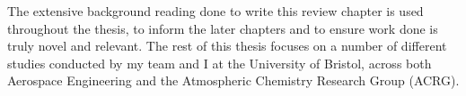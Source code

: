 The extensive background reading done to write this review chapter is used throughout the thesis, to inform the later chapters and to ensure work done is truly novel and relevant. The rest of this thesis focuses on a number of different studies conducted by my team and I at the University of Bristol, across both Aerospace Engineering and the Atmospheric Chemistry Research Group (ACRG).
